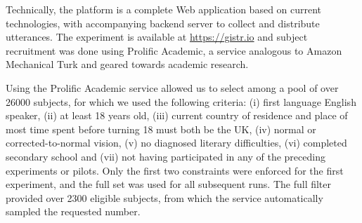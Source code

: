 \documentclass[a4paper,fleqn]{cas-dc}
\begin{document}
Technically, the platform is a complete Web application based on current
technologies, with accompanying backend server to collect and distribute
utterances.
The experiment is available at \url{https://gistr.io} and subject
recruitment was done using Prolific Academic, a service analogous to
Amazon Mechanical Turk and geared towards academic research.

Using the Prolific Academic service allowed us to select among a pool of
over \num{26000} subjects, for which we used the following criteria: (i) first language English speaker, (ii) at least 18 years old, (iii) current country of residence and place of most time spent before
  turning 18 must both be the UK, (iv) normal or corrected-to-normal vision, (v) no diagnosed literary difficulties, (vi) completed secondary school and (vii) not having participated in any of the preceding experiments or pilots.
Only the first two constraints were enforced for the first experiment,
and the full set was used for all subsequent runs. The full filter
provided over \num{2300} eligible subjects, from which the service
automatically sampled the requested number.
\end{document}
